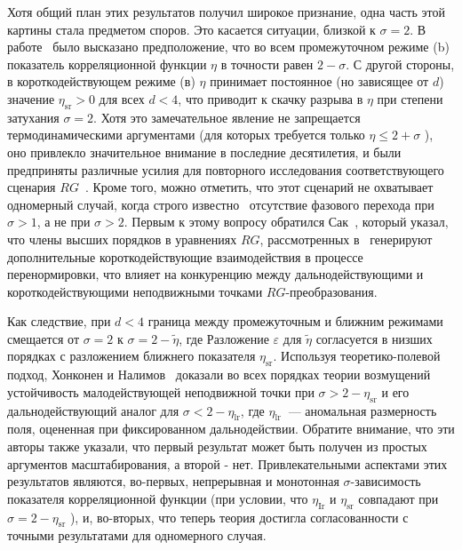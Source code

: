 Хотя общий план этих результатов получил широкое признание, одна часть этой картины стала предметом споров. Это касается ситуации, близкой к $\sigma=2$. В работе~\cite{10.1103/PhysRevLett.29.917} было высказано предположение, что во всем промежуточном режиме (b) показатель корреляционной функции $\eta$ в точности равен $2-\sigma$. С другой стороны, в короткодействующем режиме (в) $\eta$ принимает постоянное (но зависящее от $d$) значение $\eta_{\mathrm{sr}}>0$ для всех $d<4 $, что приводит к скачку разрыва в $\eta$ при степени затухания $\sigma=2$. Хотя это замечательное явление не запрещается термодинамическими аргументами (для которых требуется только $\eta\leq 2+\sigma$ ), оно привлекло значительное внимание в последние десятилетия, и были предприняты различные усилия для повторного исследования соответствующего сценария $R G$~\cite{10.1103/PhysRevB.8.281, 10.1088/0305-4470/22/6/024}. Кроме того, можно отметить, что этот сценарий не охватывает одномерный случай, когда строго известно~\cite{10.1007/BF01654281} отсутствие фазового перехода при $\sigma>1$, а не при $\sigma>2$. Первым к этому вопросу обратился Сак~\cite{10.1103/PhysRevB.8.281}, который указал, что члены высших порядков в уравнениях $RG$, рассмотренных в~\cite{10.1103/PhysRevLett.29.917} генерируют дополнительные короткодействующие взаимодействия в процессе перенормировки, что влияет на конкуренцию между дальнодействующими и короткодействующими неподвижными точками $RG$-преобразования.

Как следствие, при $d<4$ граница между промежуточным и ближним режимами смещается от $\sigma=2$ к $\sigma=2-\tilde{\eta}$, где Разложение $\varepsilon$ для $\tilde{\eta}$ согласуется в низших порядках с разложением ближнего показателя $\eta_{\mathrm{sr}}$. 
Используя теоретико-полевой подход, Хонконен и Налимов~\cite{10.1088/0305-4470/22/6/024} доказали во всех порядках теории возмущений устойчивость малодействующей неподвижной точки при $\sigma>2-\eta_{\mathrm{sr}}$ и его дальнодействующий аналог для $\sigma<2-\eta_{\mathrm{lr}}$, где $\eta_{\text {lr }}$ — аномальная размерность поля, оцененная при фиксированном дальнодействии. Обратите внимание, что эти авторы также указали, что первый результат может быть получен из простых аргументов масштабирования, а второй - нет. Привлекательными аспектами этих результатов являются, во-первых, непрерывная и монотонная $\sigma$-зависимость показателя корреляционной функции (при условии, что $\eta_{\mathrm{Ir}}$ и $\eta_{\mathrm{sr}}$ совпадают при $\sigma=2-\eta_{\mathrm{sr}}$ ), и, во-вторых, что теперь теория достигла согласованности с точными результатами для одномерного случая.

